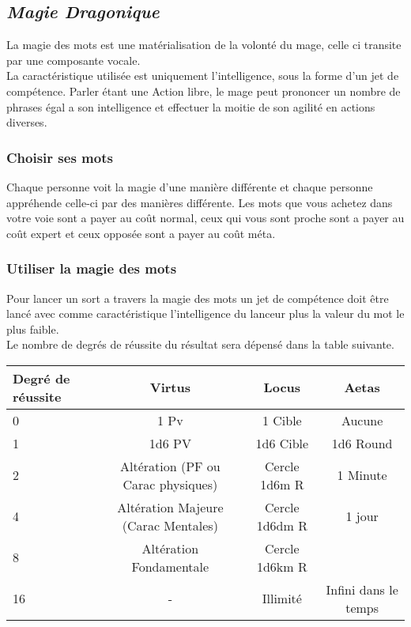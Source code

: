 \subsection{\em Magie Dragonique}
La magie des mots est une matérialisation de la volonté du mage, celle ci transite par une composante vocale.\\
La caractéristique utilisée est uniquement l'intelligence, sous la forme d’un jet de compétence. 
Parler étant une Action libre, le mage peut prononcer un nombre de phrases égal a son intelligence et effectuer la moitie de son agilité en actions diverses.
\subsubsection{Choisir ses mots}
Chaque personne voit la magie d’une manière différente et chaque personne appréhende celle-ci par des manières différente.
Les mots que vous achetez dans votre voie sont a payer au coût normal, 
ceux qui vous sont proche sont a payer au coût expert et ceux opposée sont a payer au coût méta.
\subsubsection{Utiliser la magie des mots}
Pour lancer un sort a travers la magie des mots un jet de compétence doit être lancé avec comme caractéristique 
l’intelligence du lanceur plus la valeur du mot le plus faible.\\
Le nombre de degrés de réussite du résultat sera dépensé dans la table suivante.
\begin{center}
\begin{tabular}{|l| |c|c|c|}
    \hline
    Degré de réussite &     Virtus & Locus & Aetas\\
    \hline
    \hline
    0                 & 1 Pv       & 1 Cible & Aucune \\
    1                 & 1d6 PV     & 1d6 Cible & 1d6 Round \\
    2   & Altération (PF ou Carac physiques) & Cercle 1d6m R &   1 Minute\\
    4   & Altération Majeure (Carac Mentales)& Cercle 1d6dm R &   1 jour\\
    8   & Altération Fondamentale  &   Cercle 1d6km R & \\  
    16                &  -         & Illimité&  Infini dans le temps\\
    \hline
\end{tabular}
\end{center}

